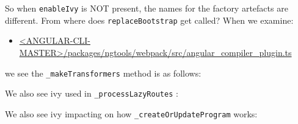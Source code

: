 So when
\texttt{enableIvy}
is NOT present, the names for the factory artefacts are different.
From where does
\texttt{replaceBootstrap}
get called? When we examine:

\begin{itemize}
  \item \href{https://github.com/angular/angular-cli/blob/master/packages/ngtools/webpack/src/angular_compiler_plugin.ts}
        {<ANGULAR-CLI-MASTER>/packages/ngtools/webpack/src/angular\_compiler\_plugin.ts}
\end{itemize}

we see the
\texttt{\_makeTransformers}
method is as follows:



We also see ivy used in
\texttt{\_processLazyRoutes}
:



We also see ivy impacting on how
\texttt{\_createOrUpdateProgram}
works:





